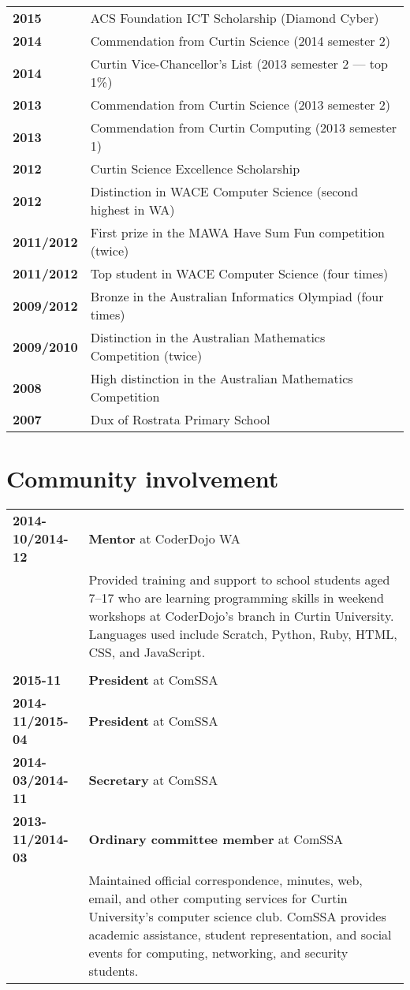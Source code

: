 \documentclass[a4paper,12pt]{article}
\begin{document}
\begin{tabular}{p{3.5cm}p{12.5cm}}
	\textbf{2015} &
		ACS Foundation ICT Scholarship (Diamond Cyber)\\
	\textbf{2014} &
		Commendation from Curtin Science (2014 semester 2)\\
	\textbf{2014} &
		Curtin Vice-Chancellor's List (2013 semester 2 --- top 1\%)\\
	\textbf{2013} &
		Commendation from Curtin Science (2013 semester 2)\\
	\textbf{2013} &
		Commendation from Curtin Computing (2013 semester 1)\\
	\textbf{2012} &
		Curtin Science Excellence Scholarship\\
	\textbf{2012} &
		Distinction in WACE Computer Science (second highest in WA)\\
	\textbf{2011/2012} &
		First prize in the MAWA Have Sum Fun competition (twice)\\
	\textbf{2011/2012} &
		Top student in WACE Computer Science (four times)\\
	\textbf{2009/2012} &
		Bronze in the Australian Informatics Olympiad (four times)\\
	\textbf{2009/2010} &
		Distinction in the Australian Mathematics Competition (twice)\\
	\textbf{2008} &
		High distinction in the Australian Mathematics Competition\\
	\textbf{2007} &
		Dux of Rostrata Primary School
\end{tabular}

\section*{Community involvement}

\begin{tabular}{p{3.5cm}p{12.5cm}}
	\textbf{2014-10/2014-12} &
		\textbf{Mentor} at CoderDojo WA\\ &
		Provided training and support to school students aged 7--17
		who are learning programming skills in weekend workshops at
		CoderDojo's branch in Curtin University. Languages used include
		Scratch, Python, Ruby, HTML, CSS, and JavaScript.\\\\
	\textbf{2015-11} &
		\textbf{President} at ComSSA\\
	\textbf{2014-11/2015-04} &
		\textbf{President} at ComSSA\\
	\textbf{2014-03/2014-11} &
		\textbf{Secretary} at ComSSA\\
	\textbf{2013-11/2014-03} &
		\textbf{Ordinary committee member} at ComSSA\\ &
		Maintained official correspondence, minutes, web, email, and
		other computing services for Curtin University's computer
		science club. ComSSA provides academic assistance, student
		representation, and social events for computing, networking,
		and security students.
\end{tabular}
\end{document}
